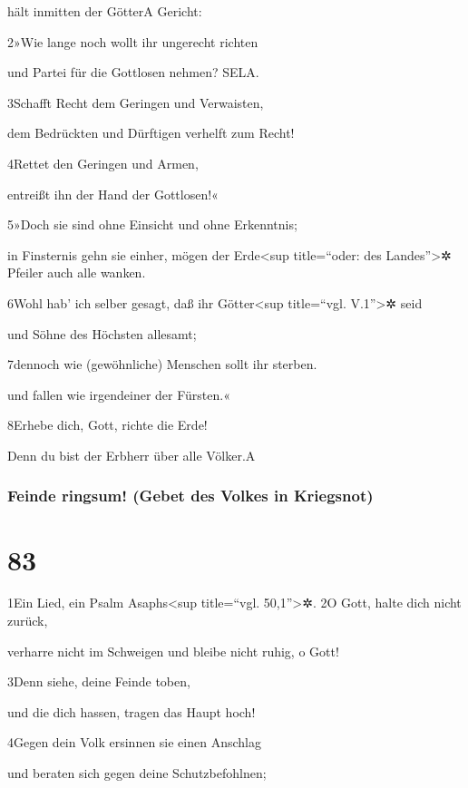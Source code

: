 hält inmitten der Götter{A} Gericht:

2»Wie lange noch wollt ihr ungerecht richten

und Partei für die Gottlosen nehmen? SELA.

3Schafft Recht dem Geringen und Verwaisten,

dem Bedrückten und Dürftigen verhelft zum Recht!

4Rettet den Geringen und Armen,

entreißt ihn der Hand der Gottlosen!«

5»Doch sie sind ohne Einsicht und ohne Erkenntnis;

in Finsternis gehn sie einher, mögen der Erde\textless sup title=``oder:
des Landes''\textgreater✲ Pfeiler auch alle wanken.

6Wohl hab' ich selber gesagt, daß ihr Götter\textless sup title=``vgl.
V.1''\textgreater✲ seid

und Söhne des Höchsten allesamt;

7dennoch wie (gewöhnliche) Menschen sollt ihr sterben.

und fallen wie irgendeiner der Fürsten.«

8Erhebe dich, Gott, richte die Erde!

Denn du bist der Erbherr über alle Völker.{A}

\hypertarget{feinde-ringsum-gebet-des-volkes-in-kriegsnot}{%
\subsubsection{Feinde ringsum! (Gebet des Volkes in
Kriegsnot)}\label{feinde-ringsum-gebet-des-volkes-in-kriegsnot}}

\hypertarget{section-82}{%
\section{83}\label{section-82}}

1Ein Lied, ein Psalm Asaphs\textless sup title=``vgl.
50,1''\textgreater✲. 2O Gott, halte dich nicht zurück,

verharre nicht im Schweigen und bleibe nicht ruhig, o Gott!

3Denn siehe, deine Feinde toben,

und die dich hassen, tragen das Haupt hoch!

4Gegen dein Volk ersinnen sie einen Anschlag

und beraten sich gegen deine Schutzbefohlnen;

